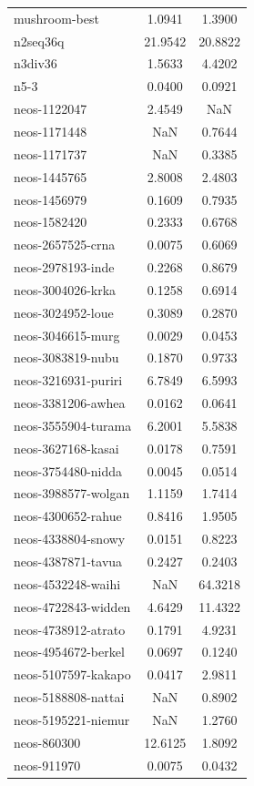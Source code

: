 \begin{longtable}{lcc}
mushroom-best & 1.0941 & 1.3900 \\
n2seq36q & 21.9542 & 20.8822 \\
n3div36 & 1.5633 & 4.4202 \\
n5-3 & 0.0400 & 0.0921 \\
neos-1122047 & 2.4549 & NaN \\
neos-1171448 & NaN & 0.7644 \\
neos-1171737 & NaN & 0.3385 \\
neos-1445765 & 2.8008 & 2.4803 \\
neos-1456979 & 0.1609 & 0.7935 \\
neos-1582420 & 0.2333 & 0.6768 \\
neos-2657525-crna & 0.0075 & 0.6069 \\
neos-2978193-inde & 0.2268 & 0.8679 \\
neos-3004026-krka & 0.1258 & 0.6914 \\
neos-3024952-loue & 0.3089 & 0.2870 \\
neos-3046615-murg & 0.0029 & 0.0453 \\
neos-3083819-nubu & 0.1870 & 0.9733 \\
neos-3216931-puriri & 6.7849 & 6.5993 \\
neos-3381206-awhea & 0.0162 & 0.0641 \\
neos-3555904-turama & 6.2001 & 5.5838 \\
neos-3627168-kasai & 0.0178 & 0.7591 \\
neos-3754480-nidda & 0.0045 & 0.0514 \\
neos-3988577-wolgan & 1.1159 & 1.7414 \\
neos-4300652-rahue & 0.8416 & 1.9505 \\
neos-4338804-snowy & 0.0151 & 0.8223 \\
neos-4387871-tavua & 0.2427 & 0.2403 \\
neos-4532248-waihi & NaN & 64.3218 \\
neos-4722843-widden & 4.6429 & 11.4322 \\
neos-4738912-atrato & 0.1791 & 4.9231 \\
neos-4954672-berkel & 0.0697 & 0.1240 \\
neos-5107597-kakapo & 0.0417 & 2.9811 \\
neos-5188808-nattai & NaN & 0.8902 \\
neos-5195221-niemur & NaN & 1.2760 \\
neos-860300 & 12.6125 & 1.8092 \\
neos-911970 & 0.0075 & 0.0432 \\

\end{longtable}
